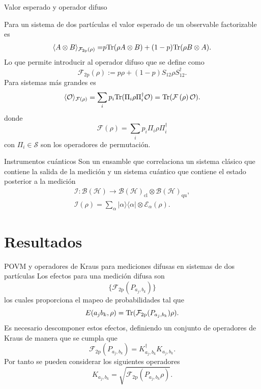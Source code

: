 \documentclass[svgnames,12pt,aspectratio=149]{beamer}
\newcommand{\ra}{\rangle}
\newcommand{\la}{\langle}
\newcommand{\rala}{\rangle\langle}
\newcommand{\tr}{{\rm Tr}}
\newcommand{\E}{\mathcal{E}}
\newcommand{\tensor}{\otimes}
\newcommand{\fuzzy}[1]{\mathcal{F}\left(#1\right)}
\newcommand{\permut}[2]{\Pi_{#1}#2\Pi_{#1}^{\dagger}}
\begin{document}
\begin{frame}{Valor esperado y operador difuso}

 
Para un sistema de dos partículas el valor esperado de un observable factorizable es 
\begin{equation*}\label{eq:Expected-Value-FM-2p}
    \begin{split}
      \la {A\otimes B}\ra_{\mathcal{F}_{2\text{p}}(\rho)} =&p\tr(\rho A\tensor B)+(1-p)\tr(\rho B\otimes A).\\
    \end{split}
\end{equation*}Lo que permite introducir al operador difuso que se define como \begin{equation*}\label{eq:op_F2p}
    \mathcal{F}_{2\text{p}}(\rho):=p\rho + (1-p)S_{12}\rho S_{12}^{\dagger}.
\end{equation*}
Para sistemas más grandes es 
\begin{equation*}\label{eq:expected-value-fm-general}
    \la \mathcal{O}\ra_{\fuzzy{\rho}}=\sum_{i}p_i\tr(\permut{i}{\rho}\mathcal{O}) =\tr(\fuzzy{\rho}\mathcal{O}).
\end{equation*} donde \begin{equation*}\label{eq:fuzzy-op-nparticles}
    \fuzzy{\rho}=\sum_{i}p_{i}\permut{i}{\rho}
 \end{equation*} con $\Pi_i \in \mathcal{S}$ son los operadores de permutación.

\end{frame}

\begin{frame}{Instrumentos cuánticos}
  Son un ensamble que correlaciona un sistema clásico que contiene la salida de la medición y un sistema cuántico que contiene el estado posterior a la medición \begin{equation*}
    \begin{split}
        \mathcal{I}: \mathcal{B(H)}\rightarrow\mathcal{B(H)}_{\text{cl}}\otimes \mathcal{B(H)}_{\text{qu}},\\
    \mathcal{I}(\rho)=\sum_\alpha |\alpha\rala\alpha|\otimes \E_\alpha(\rho).
    \end{split}
\end{equation*}
\end{frame}


\section{Resultados}
\begin{frame}{POVM y operadores de Kraus para mediciones difusas en sistemas de dos partículas}
  Los efectos para una medición difusa son \[\{\mathcal{F}_{2\text{p}}(P_{a_j,b_k})\}\]los cuales proporciona el mapeo de probabilidades tal que \[   E(a_j b_k, \rho)= \tr(\mathcal{F}_{2\text{p}}({P_{a_j,b_k}})\rho).\] Es necesario descomponer estos efectos, definiendo un conjunto de operadores de Kraus de manera que se cumpla que \[\mathcal{F}_{2\text{p}}(P_{a_j,b_k})=K_{a_j,b_k}^\dagger K_{a_j,b_k}.\] Por tanto se pueden considerar los siguientes operadores \[K_{a_j,b_k}=\sqrt{\mathcal{F}_{2\text{p}}(P_{a_j,b_k}\rho)}.\]
\end{frame}
\end{document}
